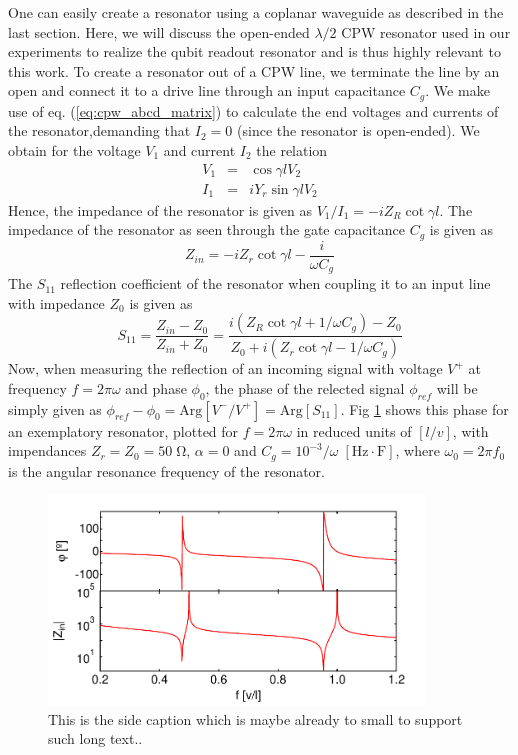 One can easily create a resonator using a coplanar waveguide as described in the last section. Here, we will discuss the open-ended $\lambda / 2$ CPW resonator used in our experiments to realize the qubit readout resonator and is thus highly relevant to this work. To create a resonator out of a CPW line, we terminate the line by an open and connect it to a drive line through an input capacitance $C_g$. We make use of eq. (\ref{eq:cpw_abcd_matrix}) to calculate the end voltages and currents of the resonator,demanding that $I_2=0$ (since the resonator is open-ended). We obtain for the voltage $V_1$ and current $I_2$ the relation
%
\begin{eqnarray}
V_1 & = & \cos{\gamma l} V_2 \\
I_1 & = & i Y_r \sin{\gamma l} V_2
\end{eqnarray}
%
Hence, the impedance of the resonator is given as $V_1/I_1 = -i Z_R \cot{\gamma l}$. The impedance of the resonator as seen through the gate capacitance $C_g$ is given as
%
\begin{equation}
Z_{in} = -i Z_r \cot{\gamma l}-\frac{i}{\omega C_g} \label{eq:cpw_impedance}
\end{equation}
%
The $S_{11}$ reflection coefficient of the resonator when coupling it to an input line with impedance $Z_0$ is given as
%
\begin{equation}
S_{11} = \frac{Z_{in}-Z_0}{Z_{in}+Z_0} = \frac{i(Z_R\cot{\gamma l}+1/\omega C_g)-Z_0}{Z_0+i(Z_r\cot{\gamma l}-1/\omega C_g)}
\end{equation}
%
Now, when measuring the reflection of an incoming signal with voltage $V^+$ at frequency $f=2\pi \omega$ and phase $\phi_0$, the phase of the relected signal $\phi_{ref}$ will be simply given as $\phi_{ref}-\phi_0=\mathrm{Arg}[V^-/V^+] = \mathrm{Arg}[S_{11}]$. Fig \ref{fig:lambda_over_4_response} shows this phase for an exemplatory resonator, plotted for $f=2\pi\omega$ in reduced units of $[l/v]$, with impendances $Z_r=Z_0=50\;\mathrm{\Omega}$, $\alpha=0$ and $C_g=10^{-3}/\omega\;[\mathrm{Hz}\cdot \mathrm{F}]$, where $\omega_0 = 2\pi f_0$ is the angular resonance frequency of the resonator.

\begin{figure}
	\includegraphics[width=10cm]{"./material/mathematica/cpw_lambda_over_4_phase_and_z"}
	\caption{This is the side caption which is maybe already to small to support such long text..}
	\label{fig:lambda_over_4_response}
\end{figure}

